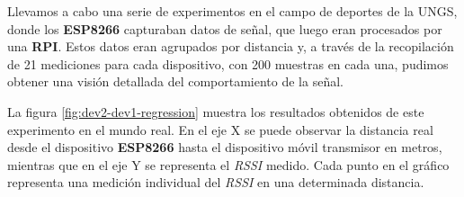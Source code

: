 Llevamos a cabo una serie de experimentos en el campo de deportes de la UNGS, donde los \textbf{ESP8266} capturaban datos de señal, que luego eran procesados por una \textbf{RPI}. Estos datos eran agrupados por distancia y, a través de la recopilación de 21 mediciones para cada dispositivo, con 200 muestras en cada una, pudimos obtener una visión detallada del comportamiento de la señal.

La figura \ref{fig:dev2-dev1-regression} muestra los resultados obtenidos de este experimento en el mundo real. En el eje X se puede observar la distancia real desde el dispositivo \textbf{ESP8266} hasta el dispositivo móvil transmisor en metros, mientras que en el eje Y se representa el \textit{RSSI} medido. Cada punto en el gráfico representa una medición individual del \textit{RSSI} en una determinada distancia.



